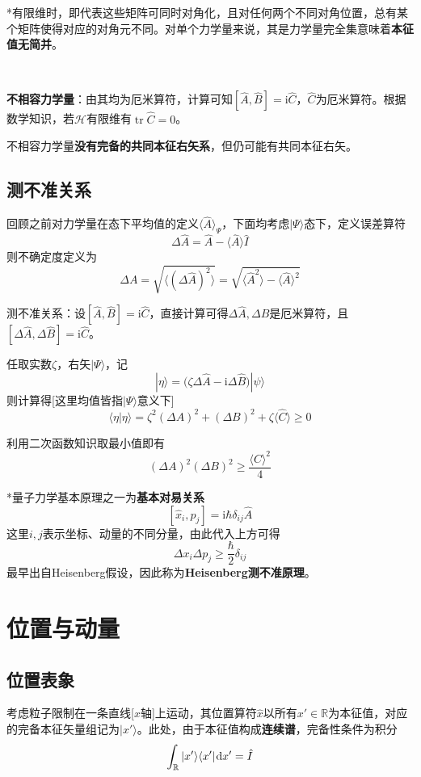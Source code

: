 \documentclass[a4paper,UTF8,fontset=windows]{ctexart}
\newcommand*{\dr}{\hspace{0.07em}\mathrm{d}}
\newcommand*{\ir}{\mathrm{i}}
\newcommand*{\ket}[1]{|#1\rangle}
\newcommand*{\bra}[1]{\langle#1|}
\newcommand*{\bk}[2]{\langle#1|#2\rangle}
\DeclareMathOperator{\tr}{tr}
\begin{document}
*有限维时，即代表这些矩阵可同时对角化，且对任何两个不同对角位置，总有某个矩阵使得对应的对角元不同。对单个力学量来说，其是力学量完全集意味着\textbf{本征值无简并}。

\

\textbf{不相容力学量}：由其均为厄米算符，计算可知$[\hat{A},\hat{B}]=\ir\hat{C}$，$\hat{C}$为厄米算符。根据数学知识，若$\mathcal{H}$有限维有$\tr\hat{C}=0$。

不相容力学量\textbf{没有完备的共同本征右矢系}，但仍可能有共同本征右矢。

\subsection{测不准关系}
回顾之前对力学量在态下平均值的定义$\langle\hat{A}\rangle_\Psi$，下面均考虑$\ket{\Psi}$态下，定义误差算符
$$\Delta\hat{A}=\hat{A}-\langle\hat{A}\rangle\hat{I}$$
则不确定度定义为
$$\Delta A=\sqrt{\langle(\Delta\hat{A})^2\rangle}=\sqrt{\langle\hat{A}^2\rangle-\langle\hat{A}\rangle^2}$$

测不准关系：设$[\hat{A},\hat{B}]=\ir\hat{C}$，直接计算可得$\Delta\hat{A},\Delta\hat{B}$是厄米算符，且$[\Delta\hat{A},\Delta\hat{B}]=\ir\hat{C}$。

任取实数$\zeta$，右矢$\ket{\Psi}$，记
$$\ket{\eta}=\big(\zeta\Delta\hat{A}-\ir\Delta\hat{B}\big)\ket{\psi}$$
则计算得[这里均值皆指$\ket{\Psi}$意义下]
$$\bk{\eta}{\eta}=\zeta^2(\Delta A)^2+(\Delta B)^2+\zeta\langle\hat{C}\rangle\ge0$$

利用二次函数知识取最小值即有
$$(\Delta A)^2(\Delta B)^2\ge\frac{\langle C\rangle^2}{4}$$

*量子力学基本原理之一为\textbf{基本对易关系}
$$[\hat{x}_i,\hat{p}_j]=\ir\hbar\delta_{ij}\hat{A}$$
这里$i,j$表示坐标、动量的不同分量，由此代入上方可得
$$\Delta x_i\Delta p_j\ge\frac{\hbar}{2}\delta_{ij}$$
最早出自Heisenberg假设，因此称为\textbf{Heisenberg测不准原理}。

\section{位置与动量}
\subsection{位置表象}
考虑粒子限制在一条直线[$x$轴]上运动，其位置算符$\hat{x}$以所有$x'\in\mathbb{R}$为本征值，对应的完备本征矢量组记为$\ket{x'}$。此处，由于本征值构成\textbf{连续谱}，完备性条件为积分
$$\int_\mathbb{R}\ket{x'}\bra{x'}\dr x'=\hat{I}$$
\end{document}
